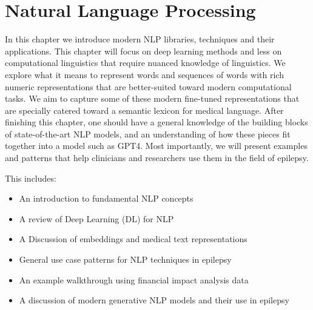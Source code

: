 
\chapter{Natural Language Processing}

In this chapter we introduce modern NLP libraries, techniques and their applications.
This chapter will focus on deep learning methods and less on computational linguistics that require nuanced knowledge of linguistics.
We explore what it means to represent words and sequences of words with rich numeric representations that are better-suited toward modern computational tasks.
We aim to capture some of these modern fine-tuned representations that are specially catered toward a semantic lexicon for medical language.
After finishing this chapter, one should have a general knowledge of the building blocks of state-of-the-art NLP models, and an understanding of how these
pieces fit together into a model such as GPT4\cite{openai2023gpt4}. Most importantly, we will present examples and patterns that help clinicians and researchers
use them in the field of epilepsy.

\noindent This includes:
\begin{itemize}
\item An introduction to fundamental NLP concepts
\item A review of Deep Learning (DL) for NLP
\item A Discussion of embeddings and medical text representations
\item General use case patterns for NLP techniques in epilepsy
\item An example walkthrough using financial impact analysis data
\item A discussion of modern generative NLP models and their use in epilepsy
\end{itemize}







